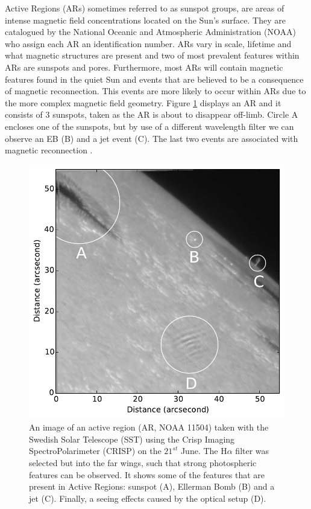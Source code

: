     Active Regions (ARs) sometimes referred to as sunspot groups, are areas of intense magnetic field concentrations located on the Sun's surface.
    They are catalogued by the National Oceanic and Atmospheric Administration (NOAA) who assign each AR an identification number.
    ARs vary in scale, lifetime and what magnetic structures are present and two of most prevalent features within ARs are sunspots and pores.
    Furthermore, most ARs will contain magnetic features found in the quiet Sun and events that are believed to be a consequence of magnetic reconnection.
    This events are more likely to occur within ARs due to the more complex magnetic field geometry.
    Figure \ref{fig:AR} displays an AR and it consists of 3 sunspots, taken as the AR is about to disappear off-limb.
    Circle A encloses one of the sunspots, but by use of a different wavelength filter we can observe an EB (B) and a jet event (C).
    The last two events are associated with magnetic reconnection \citep{2013SoPh..283..307N,2013A&A...560A..31N,2013ApJ...779..125N,2015ApJ...798...19N,2015ApJ...805...64R}.
     
    \begin{figure}
        \centering
        \includegraphics[width=\textwidth]{AR.pdf}
        \caption{
                 An image of an active region (AR, NOAA 11504) taken with the Swedish Solar Telescope (SST) using the Crisp Imaging SpectroPolarimeter (CRISP) on the $21^{{st}}$ June. 
                 The H$\alpha$ filter was selected but into the far wings, such that strong photospheric features can be observed.
                 It shows some of the features that are present in Active Regions: sunspot (A), Ellerman Bomb (B) and a jet (C).
                 Finally, a seeing effects caused by the optical setup (D).
                }
        \label{fig:AR}
     \end{figure}    

